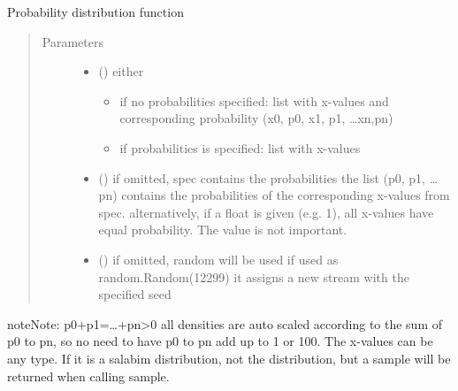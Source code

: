 \documentclass[letterpaper,10pt,english]{sphinxmanual}
\begin{document}
\begin{fulllineitems}
\label{\detokenize{Reference:salabim.Pdf}}
Probability distribution function
\begin{quote}\begin{description}
\item[{Parameters}] \leavevmode\begin{itemize}
\item {} 
 () \textendash{} 
either
\begin{itemize}
\item {} 
if no probabilities specified: 
list with x-values and corresponding probability
(x0, p0, x1, p1, …xn,pn) 

\item {} 
if probabilities is specified: 
list with x-values

\end{itemize}


\item {} 
 (\sphinxstyleliteralemphasis{, }) \textendash{} if omitted, spec contains the probabilities 
the list (p0, p1, …pn) contains the probabilities of the corresponding
x-values from spec. 
alternatively, if a float is given (e.g. 1), all x-values
have equal probability. The value is not important.

\item {} 
 () \textendash{} if omitted, random will be used 
if used as random.Random(12299)
it assigns a new stream with the specified seed

\end{itemize}

\end{description}\end{quote}

\begin{sphinxadmonition}{note}{Note:}
p0+p1=…+pn\textgreater{}0 
all densities are auto scaled according to the sum of p0 to pn,
so no need to have p0 to pn add up to 1 or 100. 
The x-values can be any type. 
If it is a salabim distribution, not the distribution,
but a sample will be returned when calling sample.
\end{sphinxadmonition}


\end{fulllineitems}
\end{document}
